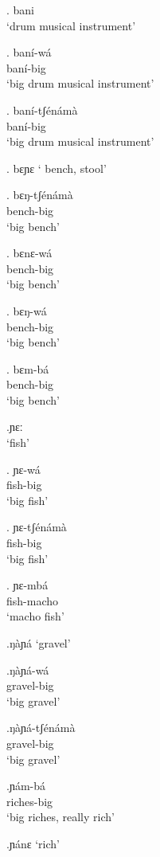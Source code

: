 \documentclass{assets/fieldnotes}
\begin{document}
\ex. bani\\
`drum musical instrument'

\ex. baní-wá\\
baní-big\\
`big drum musical instrument'

\ex. baní-tʃénámà\\
baní-big\\
`big drum musical instrument'



\ex. bɛɲɛ
` bench, stool'

\exg. bɛŋ-tʃénámà\\
bench-big\\
`big bench'

\exg. bɛnɛ-wá\\
bench-big\\
`big bench'

\exg. bɛŋ-wá\\
bench-big\\
`big bench'

\exg. bɛm-bá\\
bench-big\\
`big bench'

\ex.ɲɛː\\
`fish'

\ex. ɲɛ-wá\\
fish-big\\
`big fish'

\ex. ɲɛ-tʃénámà\\
fish-big\\
`big fish'

\ex. ɲɛ-mbá\\
fish-macho\\
`macho fish'


\ex.ŋàɲá
`gravel'

\exg.ŋàɲá-wá\\
gravel-big\\
`big gravel'

\exg.ŋàɲá-tʃénámà\\
gravel-big\\
`big gravel'

\exg.ɲám-bá\\
riches-big\\
`big riches, really rich'

\ex.ɲánɛ
`rich'
\end{document}
